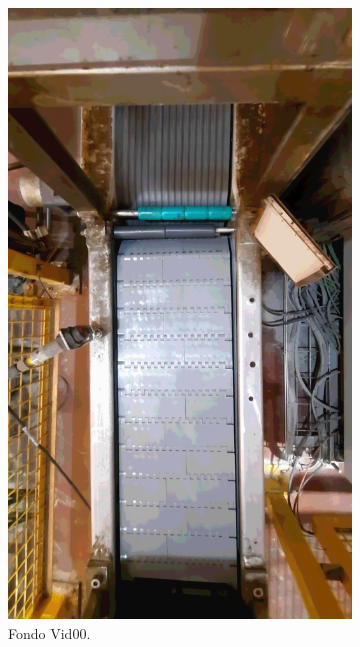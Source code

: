 \documentclass[11pt]{memoir}
\begin{document}
\begin{center}
\begin{figure}[H]
\begin{subfigure}{0.3\textwidth}
    \includegraphics[width=\textwidth]{img/F1}
    \caption{Fondo Vid00.}
    \label{fig:fondo-Vid00}
\end{subfigure}
\hfill
\begin{subfigure}{0.3\textwidth}

\end{subfigure}
\end{figure}
\end{center}
\end{document}

